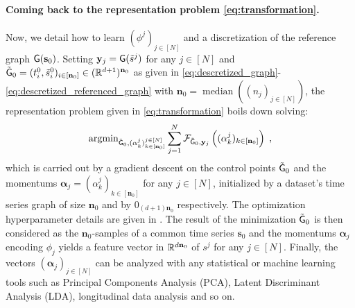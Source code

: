    \paragraph{Coming back to the representation problem \eqref{eq:transformation}.}
   Now, we detail how to learn $(\phi^j)_{j\in[N]}$ and a discretization of the reference graph $\mathsf{G}(\mathbf{s}_0)$.
    Setting $\mathbf{y}_j=\mathsf{G}(\tilde{s}^j)$ for any $j\in[N]$ and $\tilde{\mathsf{G}}_0=(t_i^0,\tilde{s}^0_i)_{i\in[\mathbf{n}_0]}\in (\mathbb{R}^{d+1})^{\mathbf{n}_0} $ as given in \eqref{eq:descretized_graph}-\eqref{eq:descretized_referenced_graph} with $\mathbf{n}_0=\operatorname{median}((n_j)_{j\in[N]})$, the representation problem given in \eqref{eq:transformation} boils down solving:
    \begin{equation}
      \label{eq:general_optimization_problem}
      \operatorname{argmin}_{\tilde{\mathsf{G}}_0,(\alpha_k^j)_{k\in [\mathbf{n}_0]}^{j\in[N]}} \sum_{j=1}^N \mathcal{F}_{\tilde{\mathsf{G}}_0,\mathbf{y}_j}\left((\alpha_k^j)_{k\in [\mathbf{n}_0]}\right)\; ,
    \end{equation}
    which is carried out by a gradient descent on the control points $\tilde{\mathsf{G}}_0$ and the momentums $\mathbf{\alpha}_j=(\alpha_k^j)_{k\in [\mathbf{n}_0]}$ for any $j\in[N]$, initialized by a dataset's time series graph of size $\mathbf{n}_0$ and by $0_{(d+1)\mathbf{n}_0}$ respectively.
    The optimization hyperparameter details are given in .
   The result of the minimization $\tilde{\mathsf{G}}_0$ is then considered as the $\mathbf{n}_0$-samples of a common time series $\mathbf{s}_0$ and the momentums $\mathbf{\alpha}_j$ encoding $\phi_j$ yields a feature vector in $\mathbb{R}^{d \mathbf{n}_0} $ of $s^j$ for any $j\in[N]$.
   Finally, the vectors $(\mathbf{\alpha}_j)_{j\in[N]}$ can be analyzed with any statistical or machine learning tools such as Principal Components Analysis (PCA), Latent Discriminant Analysis (LDA), longitudinal data analysis and so on.



  
   
  

